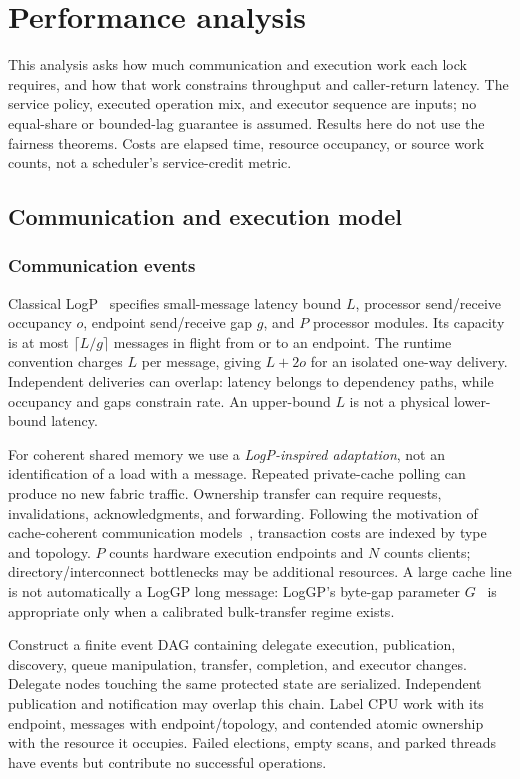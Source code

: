 \section{Performance analysis}
\label{sec:performance}
This analysis asks how much communication and execution work each lock
requires, and how that work constrains throughput and caller-return latency.
The service policy, executed operation mix, and executor sequence are inputs;
no equal-share or bounded-lag guarantee is assumed. Results here do not use
the fairness theorems. Costs are elapsed time, resource occupancy, or source
work counts, not a scheduler's service-credit metric.

\subsection{Communication and execution model}
\label{sec:model}
\subsubsection{Communication events}
Classical LogP~\cite{logp} specifies small-message latency bound $L$, processor
send/receive occupancy $o$, endpoint send/receive gap $g$, and $P$ processor
modules. Its capacity is at most $\lceil L/g\rceil$ messages in flight from
or to an endpoint. The runtime convention charges $L$ per message, giving
$L+2o$ for an isolated one-way delivery. Independent deliveries can overlap:
latency belongs to dependency paths, while occupancy and gaps constrain rate.
An upper-bound $L$ is not a physical lower-bound latency.

For coherent shared memory we use a \emph{LogP-inspired adaptation}, not an
identification of a load with a message. Repeated private-cache polling can
produce no new fabric traffic. Ownership transfer can require requests,
invalidations, acknowledgments, and forwarding. Following the motivation of
cache-coherent communication models~\cite{coherence}, transaction costs are
indexed by type and topology. $P$ counts hardware execution endpoints and
$N$ counts clients; directory/interconnect bottlenecks may be additional
resources. A large cache line is not automatically a LogGP long message:
LogGP's byte-gap parameter $G$~\cite{loggp} is appropriate only when a calibrated
bulk-transfer regime exists.


Construct a finite event DAG containing delegate execution, publication,
discovery, queue manipulation, transfer, completion, and executor changes.
Delegate nodes touching the same protected state are serialized. Independent
publication and notification may overlap this chain. Label CPU work with its
endpoint, messages with endpoint/topology, and contended atomic ownership
with the resource it occupies. Failed elections, empty scans, and parked
threads have events but contribute no successful operations.

